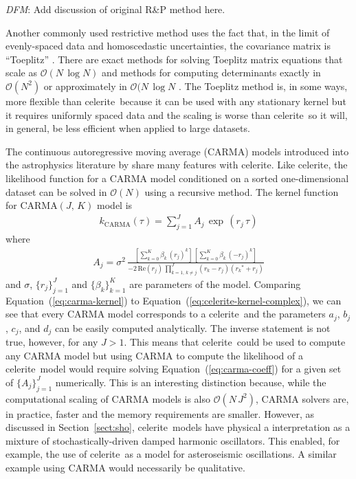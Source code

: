 \documentclass[manuscript, letterpaper]{aastex6}
\newcommand{\project}[1]{\textsf{#1}}
\newcommand{\celerite}{\project{celerite}}
\renewcommand{\eqref}[1]{\ref{eq:#1}}
\newcommand{\Eq}[1]{Equation~(\eqref{#1})}
\newcommand{\eq}[1]{\Eq{#1}}
\newcommand{\eqlabel}[1]{\label{eq:#1}}
\newcommand{\sectionname}{Section}
\newcommand{\sectref}[1]{\ref{sect:#1}}
\newcommand{\Sect}[1]{\sectionname~\sectref{#1}}
\newcommand{\sect}[1]{\Sect{#1}}
\newcommand{\todo}[3]{{\color{#2}\emph{#1}: #3}}
\newcommand{\dfmtodo}[1]{\todo{DFM}{red}{#1}}
\begin{document}
\dfmtodo{Add discussion of original R\&P method here.}

Another commonly used restrictive method uses the fact that, in the limit of
evenly-spaced data and homoscedastic uncertainties, the covariance matrix is
``Toeplitz'' \citep[for example][]{Dillon:2013}.
There are exact methods for solving Toeplitz matrix equations that scale as
$\mathcal{O}(N\,\log N)$ and methods for computing determinants exactly in
$\mathcal{O}(N^2)$ or approximately in $\mathcal{O}(N\,\log N$
\citep{Wilson:2014}.
The Toeplitz method is, in some ways, more flexible than \celerite\ because it
can be used with any stationary kernel but it requires uniformly spaced data
and the scaling is worse than \celerite\ so it will, in general, be less
efficient when applied to large datasets.

The continuous autoregressive moving average (CARMA) models introduced into
the astrophysics literature by \citet{Kelly:2014} share many features with
\celerite.
Like \celerite, the likelihood function for a CARMA model conditioned on a
sorted one-dimensional dataset can be solved in $\mathcal{O}(N)$ using a
recursive method.
The kernel function for CARMA$(J,\,K)$ model is \citep{Kelly:2014}
\begin{eqnarray}\eqlabel{carma-kernel}
k_\mathrm{CARMA}(\tau) = \sum_{j=1}^J A_j\,\exp\,(r_j\,\tau)
\end{eqnarray}
where
\begin{eqnarray}\eqlabel{carma-coeff}
A_j = \sigma^2 \,\frac{\left[\sum_{k=0}^K\beta_k\,{(r_j)}^k\right]\,
    \left[\sum_{k=0}^K\beta_k\,{(-r_j)}^k\right]}
    {-2\,\mathrm{Re}(r_j)\,\prod_{k=1,\,k \ne j}^{J}(r_k-r_j)({r_k}^*+r_j)}
\end{eqnarray}
and $\sigma$, $\{r_j\}_{j=1}^J$ and $\{\beta_k\}_{k=1}^K$ are parameters of
the model.
Comparing \eq{carma-kernel} to \eq{celerite-kernel-complex}, we can see that
every CARMA model corresponds to a \celerite\ and the parameters $a_j$, $b_j$,
$c_j$, and $d_j$ can be easily computed analytically.
The inverse statement is not true, however, for any $J > 1$.
This means that \celerite\ could be used to compute any CARMA model but using
CARMA to compute the likelihood of a \celerite\ model would require solving
\eq{carma-coeff} for a given set of $\{A_j\}_{j=1}^J$ numerically.
This is an interesting distinction because, while the computational scaling of
CARMA models is also $\mathcal{O}(N\,J^2)$, CARMA solvers are, in practice,
faster and the memory requirements are smaller.
However, as discussed in \sect{sho}, \celerite\ models have physical a
interpretation as a mixture of stochastically-driven damped harmonic
oscillators.
This enabled, for example, the use of \celerite\ as a model for asteroseismic
oscillations.
A similar example using CARMA would necessarily be qualitative.
\end{document}
